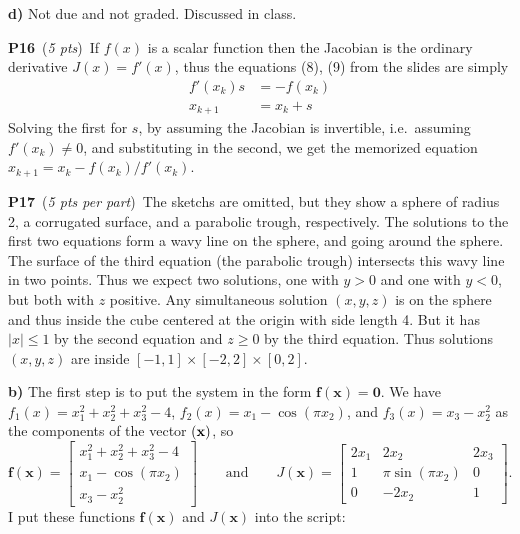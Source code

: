 \documentclass[11pt]{amsart}
\newcommand{\bbf}{\mathbf{f}}
\newcommand{\bx}{\mathbf{x}}
\newcommand{\bzero}{\mathbf{0}}
\newcommand{\mfile}[2]{
\bigskip
\begin{quote}
\medskip
\VerbatimInput[frame=single,framesep=3mm,label=\fbox{\normalsize \textsl{\,#1\,}},fontfamily=courier,fontsize=\scriptsize]{#2}
\medskip
\end{quote}
}
\newcommand{\probpts}[2]{\bigskip\noindent\large \textbf{#1} \normalsize \,(\emph{#2})\,}
\newcommand{\epart}[1]{\medskip\noindent\textbf{#1)}}
\begin{document}
\epart{d}  Not due and not graded.  Discussed in class.


\probpts{P16}{5 pts}  If $f(x)$ is a scalar function then the Jacobian is the ordinary derivative $J(x) = f'(x)$, thus the equations (8), (9) from the slides are simply
\begin{align*}
f'(x_k) s &= -f(x_k) \\
x_{k+1} &= x_k + s
\end{align*}
Solving the first for $s$, by assuming the Jacobian is invertible, i.e.~assuming $f'(x_k)\ne 0$, and substituting in the second, we get the memorized equation $x_{k+1} = x_k - f(x_k) / f'(x_k)$.


\clearpage\newpage
\probpts{P17}{5 pts per part}  The sketchs are omitted, but they show a sphere of radius 2, a corrugated surface, and a parabolic trough, respectively.  The solutions to the first two equations form a wavy line on the sphere, and going around the sphere.  The surface of the third equation (the parabolic trough) intersects this wavy line in two points.  Thus we expect two solutions, one with $y>0$ and one with $y<0$, but both with $z$ positive.  Any simultaneous solution $(x,y,z)$ is on the sphere and thus inside the cube centered at the origin with side length 4.  But it has $|x|\le 1$ by the second equation and $z\ge 0$ by the third equation.  Thus solutions $(x,y,z)$ are inside $[-1,1]\times [-2,2] \times [0,2]$.

\epart{b}  The first step is to put the system in the form $\bbf(\bx)=\bzero$.  We have $f_1(x) = x_1^2 + x_2^2 + x_3^2 - 4$, $f_2(x) = x_1 - \cos(\pi x_2)$, and $f_3(x) = x_3 - x_2^2$ as the components of the vector $\bf(\bx)$, so
  $$\bbf(\bx) = \begin{bmatrix} x_1^2 + x_2^2 + x_3^2 - 4 \\ x_1 - \cos(\pi x_2) \\ x_3 - x_2^2 \end{bmatrix} \qquad \text{and} \qquad J(\bx) = \begin{bmatrix} 2 x_1 & 2 x_2 & 2 x_3 \\ 1 & \pi \sin(\pi x_2) & 0 \\ 0 & -2 x_2 & 1 \end{bmatrix}.$$
I put these functions $\bbf(\bx)$ and $J(\bx)$ into the script:

\mfile{newtonex.m}{newtonex.m}
\end{document}
